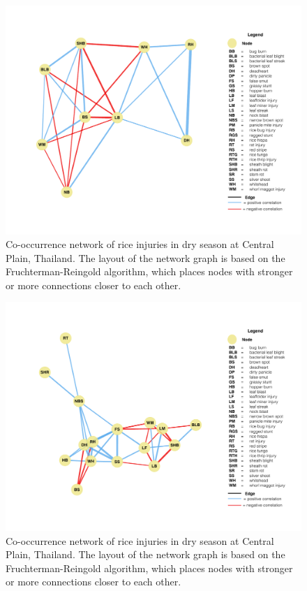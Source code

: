 \begin{figure}
    \centering
        \includegraphics[width = 1\textwidth]{figures/fullnetwork_ODds.pdf}
        \caption{Co-occurrence network of rice injuries in dry season at Central Plain, Thailand. The layout of the network graph is based on the Fruchterman-Reingold algorithm, which places nodes with stronger or more connections closer to each other.}
        \label{fig:fullnetwork_ODds}
    \end{figure}

\begin{figure}
    \centering
        \includegraphics[width = 1\textwidth]{figures/fullnetwork_ODws.pdf}
        \caption{Co-occurrence network of rice injuries in dry season at Central Plain, Thailand. The layout of the network graph is based on the Fruchterman-Reingold algorithm, which places nodes with stronger or more connections closer to each other.}
        \label{fig:fullnetwork_ODws}
    \end{figure}

